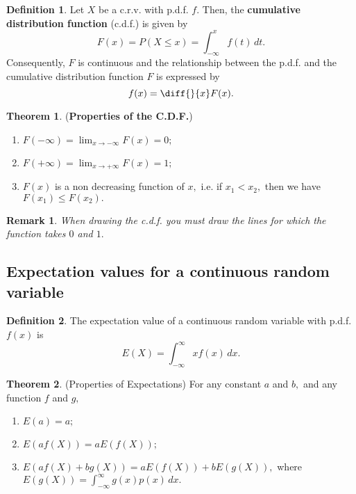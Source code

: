 \documentclass[12pt, a4paper]{article}
\newtheorem*{remark}{Remark}
\theoremstyle{definition}
\newtheorem{definition}{Definition}[section]
\newtheorem{theorem}{Theorem}[section]
\theoremstyle{plain}
\begin{document}
\begin{definition}
Let $X$ be a c.r.v. with p.d.f. $f.$ Then, the \textbf{cumulative distribution function} (c.d.f.) is given by $$F(x)=P(X\leq x)=\int_{-\infty}^{x} f(t)\,dt.$$Consequently, $F$ is continuous and the relationship between the p.d.f. and the cumulative distribution function $F$ is expressed by $$f(x)=\diff{}{x}F(x).$$

\end{definition}

\begin{theorem}
(\textbf{Properties of the C.D.F.}) \begin{enumerate}
	
	\item $F(-\infty)=\lim_{x \to -\infty}F(x)=0;$
	\item $F(+\infty)=\lim_{x \to +\infty}F(x)=1;$
	\item $F(x)$ is a non decreasing function of $x,$ i.e. if $x_1<x_2,$ then we have $F(x_1)\leq F(x_2).$

\end{enumerate}
\end{theorem}

\begin{remark}
When drawing the c.d.f. you must draw the lines for which the function takes $0$ and $1.$
\end{remark}

\subsection{Expectation values for a continuous random variable}

\begin{definition}
The expectation value of a continuous random variable with p.d.f. $f(x)$ is $$E(X)=\int_{-\infty}^{\infty}xf(x)\,dx.$$
\end{definition}

\begin{theorem}
(Properties of Expectations) For any constant $a$ and $b,$ and any function $f$ and $g,$ \begin{enumerate}
	
	\item $E(a)=a;$
	\item $E(af(X))=aE(f(X));$
	\item $E(af(X)+bg(X))=aE(f(X))+bE(g(X)),$ where $E(g(X))=\int_{-\infty}^{\infty}g(x)p(x) \, dx.$

\end{enumerate} 
\end{theorem}
\end{document}
